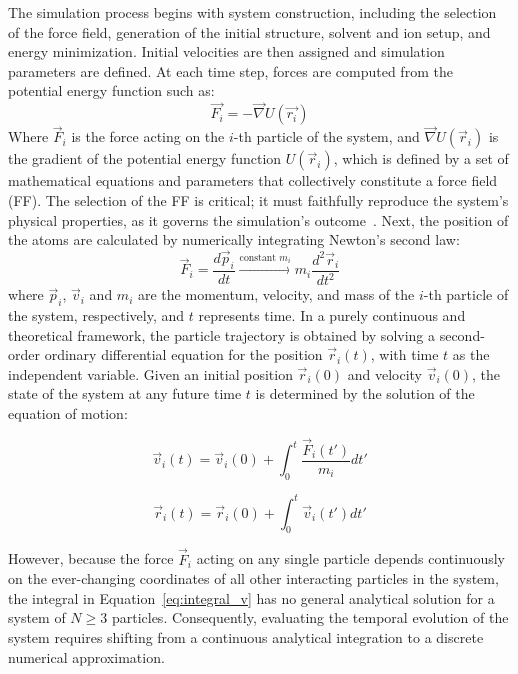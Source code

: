 The simulation process begins with system construction, including the selection of the force field, generation of the initial structure, solvent and ion setup, and energy minimization. Initial velocities are then assigned and simulation parameters are defined. At each time step, forces are computed from the potential energy function such as: 
\begin{equation}\label{NG}
    \vec{F_i} = - \vec{\nabla} U(\vec{r_{i}})
\end{equation}
Where $\vec{F}_i$ is the force acting on the $i$-th particle of the system, and $\vec{\nabla} U(\vec{r}_i)$ is the gradient of the potential energy function $U(\vec{r}_i)$, which is defined by a set of mathematical equations and parameters that collectively constitute a force field (FF). The selection of the FF is critical; it must faithfully reproduce the system's physical properties, as it governs the simulation's outcome~\cite{sereina,Conde2022}. Next, the position of the atoms are calculated by numerically integrating Newton's second law:
\begin{equation}\label{N2L}
    \vec{F}_i 
    = \frac{d\vec{p}_i}{dt}
    \xrightarrow{\text{constant }m_i}
    m_i \frac{d^2\vec{r}_i}{dt^2}
\end{equation}
where \(\vec{p}_i\), \(\vec{v}_i\) and \(m_i\) are the momentum, velocity, and mass of the \(i\)-th particle of the system, respectively, and \(t\) represents time. 
In a purely continuous and theoretical framework, the particle trajectory is
obtained by solving a second-order ordinary differential equation for the
position $\vec{r}_i(t)$, with time $t$ as the independent variable. Given an
initial position $\vec{r}_i(0)$ and velocity $\vec{v}_i(0)$, the state of the
system at any future time $t$ is determined by the solution of the equation
of motion:

\begin{equation}\label{eq:integral_v}
    \vec{v}_i(t) = \vec{v}_i(0) + \int_{0}^{t} \frac{\vec{F}_i(t')}{m_i} dt'
\end{equation}

\begin{equation}\label{eq:integral_r}
    \vec{r}_i(t) = \vec{r}_i(0) + \int_{0}^{t} \vec{v}_i(t') dt'
\end{equation}

However, because the force $\vec{F}_i$ acting on any single particle depends continuously on the ever-changing coordinates of all other interacting particles in the system, the integral in Equation~\ref{eq:integral_v} has no general analytical solution for a system of $N \geq 3$ particles. Consequently, evaluating the temporal evolution of the system requires shifting from a continuous analytical integration to a discrete numerical approximation.

